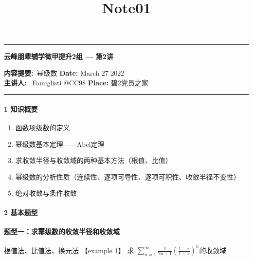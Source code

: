 \documentclass[12pt]{scrartcl}
\title{Note01}
\begin{document}
\begin{center}
	\hrule
	\vspace{.4cm}
	{\textbf { \large 云峰朋辈辅学微甲提升2组 --- 第2讲}}
\end{center}
{\textbf{内容提要:}\ 幂级数 \hspace{\fill} \textbf{Date:} March 27 2022    \\
{ \textbf{主讲人:}} \ Famiglisti @CC98  \hspace{\fill} \textbf{Place:} 碧2党员之家 \\
	\hrule

    
\paragraph*{\large 1 知识概要}
\begin{enumerate}
    \item  函数项级数的定义
    \item  幂级数基本定理——Abel定理
    \item  求收敛半径与收敛域的两种基本方法（根值、比值）
    \item  幂级数的分析性质（连续性、逐项可导性、逐项可积性、收敛半径不变性）
    \item  绝对收敛与条件收敛
\end{enumerate}

\paragraph*{\large 2 基本题型}

\paragraph*{题型一：求幂级数的收敛半径和收敛域}\leavevmode \newline
根值法、比值法、换元法\newline
【example 1】 求 $\sum_{n = 1}^{\infty}\frac{1}{2n+1} (\frac{1-x}{1+x})^n$的收敛域\\
\\
\\
\\
\\
}
\end{document}
